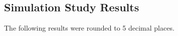

\subsection{Simulation Study Results}\label{Tables_sim}
The following results were rounded to 5 decimal places.

	
	
	

